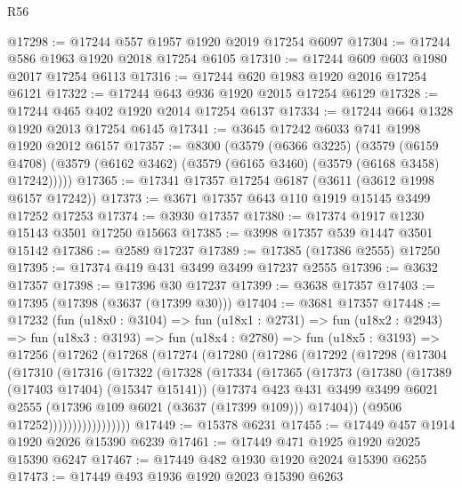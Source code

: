 \begin{lexlean}{R56}
\begin{coremodule}
@17298 := @17244 @557 @1957 @1920 @2019 @17254 @6097
@17304 := @17244 @586 @1963 @1920 @2018 @17254 @6105
@17310 := @17244 @609 @603 @1980 @2017 @17254 @6113
@17316 := @17244 @620 @1983 @1920 @2016 @17254 @6121
@17322 := @17244 @643 @936 @1920 @2015 @17254 @6129
@17328 := @17244 @465 @402 @1920 @2014 @17254 @6137
@17334 := @17244 @664 @1328 @1920 @2013 @17254 @6145
@17341 := @3645 @17242 @6033 @741 @1998 @1920 @2012 @6157
@17357 := @8300
    (@3579
      (@6366 @3225)
      (@3579
        (@6159 @4708)
        (@3579 (@6162 @3462) (@3579 (@6165 @3460) (@3579 (@6168 @3458) @17242)))))
@17365 := @17341 @17357 @17254 @6187 (@3611 (@3612 @1998 @6157 @17242))
@17373 := @3671 @17357 @643 @110 @1919 @15145 @3499 @17252 @17253
@17374 := @3930 @17357
@17380 := @17374 @1917 @1230 @15143 @3501 @17250 @15663
@17385 := @3998 @17357 @539 @1447 @3501 @15142
@17386 := @2589 @17237
@17389 := @17385 (@17386 @2555) @17250
@17395 := @17374 @419 @431 @3499 @3499 @17237 @2555
@17396 := @3632 @17357
@17398 := @17396 @30 @17237
@17399 := @3638 @17357
@17403 := @17395 (@17398 (@3637 (@17399 @30)))
@17404 := @3681 @17357
@17448 := @17232
    (fun (u18x0 : @3104) =>
    fun (u18x1 : @2731) =>
    fun (u18x2 : @2943) =>
    fun (u18x3 : @3193) =>
    fun (u18x4 : @2780) =>
    fun (u18x5 : @3193) =>
    @17256
      (@17262
        (@17268
          (@17274
            (@17280
              (@17286
                (@17292
                  (@17298
                    (@17304
                      (@17310
                        (@17316
                          (@17322
                            (@17328
                              (@17334
                                (@17365
                                  (@17373
                                    (@17380
                                      (@17389 (@17403 @17404) (@15347 @15141))
                                      (@17374
                                        @423
                                        @431
                                        @3499
                                        @3499
                                        @6021
                                        @2555
                                        (@17396 @109 @6021 (@3637 (@17399 @109)))
                                        @17404))
                                    (@9506 @17252)))))))))))))))))
@17449 := @15378 @6231
@17455 := @17449 @457 @1914 @1920 @2026 @15390 @6239
@17461 := @17449 @471 @1925 @1920 @2025 @15390 @6247
@17467 := @17449 @482 @1930 @1920 @2024 @15390 @6255
@17473 := @17449 @493 @1936 @1920 @2023 @15390 @6263

\end{coremodule}
\end{lexlean}
